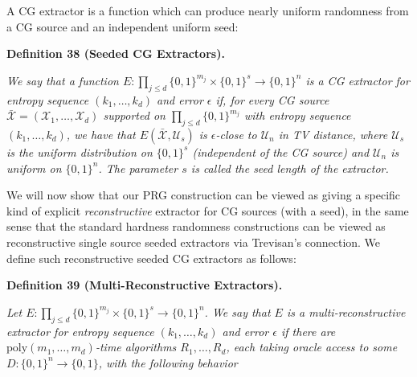 \documentclass[10pt,a4paper]{article}
\begin{document}
A CG extractor is a function which can produce nearly uniform randomness from a CG source and an independent uniform seed:\par





\par\medskip\noindent\textbf{
\textbf{Definition 38}\textbf{ }(Seeded CG Extractors)\textbf{.}
}\par



\emph{We say that a function $E:\prod_{j\leq d}\{0,1\}^{m_{j}}\times\{0,1\}^{s}\to\{0,1\}^{n}$ is a CG extractor for entropy sequence $(k_{1},\ldots,k_{d})$ and error $\epsilon$ if, for every CG source $\bar{\mathcal{X}}=(\mathcal{X}_{1},\ldots,\mathcal{X}_{d})$ supported on $\prod_{j\leq d}\{0,1\}^{m_{j}}$ with entropy sequence $(k_{1},\ldots,k_{d})$, we have that $E(\bar{\mathcal{X}},\mathcal{U}_{s})$ is $\epsilon$-close to $\mathcal{U}_{n}$ in TV distance, where $\mathcal{U}_{s}$ is the uniform distribution on $\{0,1\}^{s}$ (independent of the CG source) and $\mathcal{U}_{n}$ is uniform on $\{0,1\}^{n}$. The parameter $s$ is called the seed length of the extractor.}\par






We will now show that our PRG construction can be viewed as giving a specific kind of explicit \emph{reconstructive} extractor for CG sources (with a seed), in the same sense that the standard hardness randomness constructions can be viewed as reconstructive single source seeded extractors via Trevisan’s connection. We define such reconstructive seeded CG extractors as follows:\par





\par\medskip\noindent\textbf{
\textbf{Definition 39}\textbf{ }(Multi-Reconstructive Extractors)\textbf{.}
}\par



\emph{Let $E:\prod_{j\leq d}\{0,1\}^{m_{j}}\times\{0,1\}^{s}\to\{0,1\}^{n}$. We say that $E$ is a multi-reconstructive extractor for entropy sequence $(k_{1},\ldots,k_{d})$ and error $\epsilon$ if there are $\mathrm{poly}(m_{1},\ldots,m_{d})$-time algorithms $R_{1},\ldots,R_{d}$, each taking oracle access to some $D:\{0,1\}^{n}\to\{0,1\}$, with the following behavior}\par
\end{document}
